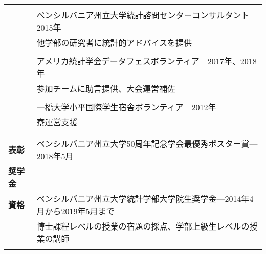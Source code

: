 \documentclass[utf8,letterpaper,oneside]{article}
\begin{document}
\begin{center}
\begin{tabular}{l l}
                      &                                                                                                \\
                      & ペンシルバニア州立大学統計諮問センターコンサルタント---2015年                                  \\
                      & 他学部の研究者に統計的アドバイスを提供                                                         \\
                      &                                                                                                \\
                      & アメリカ統計学会データフェスボランティア---2017年、2018年                                      \\
                      & 参加チームに助言提供、大会運営補佐                                                             \\
                      &                                                                                                \\
                      & 一橋大学小平国際学生宿舎ボランティア---2012年                                                  \\
                      & 寮運営支援                                                                                     \\
                      &                                                                                                
  \\\hline
                      &                                                                                                \\
  \textbf{表彰}       & ペンシルバニア州立大学50周年記念学会最優秀ポスター賞---2018年5月                               \\
  \textbf{奨学金}
                      &                                                                                                \\
  \textbf{資格}       & ペンシルバニア州立大学統計学部大学院生奨学金---2014年4月から2019年5月まで                      \\
                      & 博士課程レベルの授業の宿題の採点、学部上級生レベルの授業の講師                                 \\
                      &                                                                                                \\

\end{tabular}
\end{center}
\end{document}
